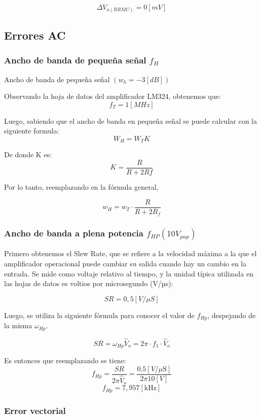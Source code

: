 \[ \Delta V_{o (RRMC) }=0 [ mV ]\]


\subsection{Errores AC}

\subsubsection{Ancho de banda de pequeña señal $f_H$}



Ancho de banda de pequeña señal $\left(w_{h}=-3[d B]\right)$

Observando la hoja de datos del amplificador LM324, obtenemos que:
\[f_T = 1 [MHz]\]
 

Luego, sabiendo que el ancho de banda en pequeña señal se puede calcular con la siguiente formula: 
\[ W_H = W_{T} K \]

De donde K es:
\[ K=\frac{R}{R+2 R f}\]

Por lo tanto, reemplazando en la fórmula general,

\[ w_H = w_{T} \cdot \frac{R}{R+2 R_f} \]


\subsubsection{Ancho de banda a plena potencia \(f_{HP} (10 V_{pap})\) } 


Primero obtenemos el Slew Rate, que se refiere a la velocidad máxima a la que el amplificador operacional puede cambiar su salida cuando hay un cambio en la entrada. Se mide como voltaje relativo al tiempo, y la unidad típica utilizada en las hojas de datos es voltios por microsegundo (V/µs):


 \[ S R=0,5[V / \mu S] \] 

Luego, se utiliza la siguiente fórmula para conocer el valor de $f_{Hp}$, despejando de la misma $\omega_{Hp}$.

\[ S R = \omega_{Hp} \hat{V}_{o} = 2 \pi \cdot  f_{1} \cdot  \hat{V}_{o} \]

Es entonces que reemplazando se tiene:
\[ f_{Hp} = \frac{S R}{2 \pi \hat{V}_{o}} = \frac{0.5[V/ \mu \mathrm{S}]}{2 \pi 10[V]} \]
\[ f_{Hp} = 7,957 [\mathrm{kHz}] \]

\subsubsection{Error vectorial }

